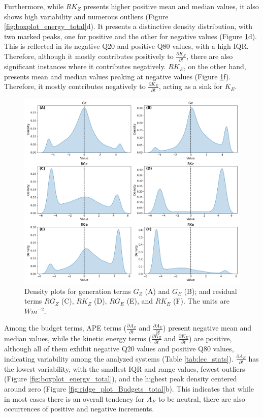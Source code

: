Furthermore, while $RK_Z$ presents higher positive mean and median values, it also shows high variability and numerous outliers (Figure \ref{fig:boxplot_energy_total}d). It presents a distinctive density distribution, with two marked peaks, one for positive and the other for negative values (Figure \ref{fig:ridge_plot_Generation_Dissipation_Terms_total}d). This is reflected in its negative Q20 and positive Q80 values, with a high IQR. Therefore, although it mostly contributes positively to $\frac{\partial K_Z}{\partial t}$, there are also significant instances where it contributes negatively. $RK_E$, on the other hand, presents mean and median values peaking at negative values (Figure \ref{fig:ridge_plot_Generation_Dissipation_Terms_total}f). Therefore, it mostly contributes negatively to $\frac{\partial K_E}{\partial t}$, acting as a sink for $K_E$.

\begin{figure}[!htbp]
\centering
\includegraphics[width=\textwidth]{figs_5/ridge_plot_Generation_Dissipation_Terms_total.png}
\caption[Density Plots - Generation Terms]{Density plots for generation terms $G_Z$ (A) and $G_E$ (B); and residual terms $RG_Z$ (C), $RK_Z$ (D), $RG_E$ (E), and $RK_E$ (F). The units are $W m^{-2}$.}
\label{fig:ridge_plot_Generation_Dissipation_Terms_total}
\end{figure}

Among the budget terms, APE terms ($\frac{\partial A_Z}{\partial t}$ and $\frac{\partial A_E}{\partial t}$) present negative mean and median values, while the kinetic energy terms ($\frac{\partial K_Z}{\partial t}$ and $\frac{\partial K_E}{\partial t}$) are positive, although all of them exhibit negative Q20 values and positive Q80 values, indicating variability among the analyzed systems (Table \ref{tab:lec_stats}).  $\frac{\partial A_E}{\partial t}$ has the lowest variability, with the smallest IQR and range values, fewest outliers (Figure \ref{fig:boxplot_energy_total}), and the highest peak density centered around zero (Figure \ref{fig:ridge_plot_Budgets_total}b). This indicates that while in most cases there is an overall tendency for $A_E$ to be neutral, there are also occurrences of positive and negative increments.


